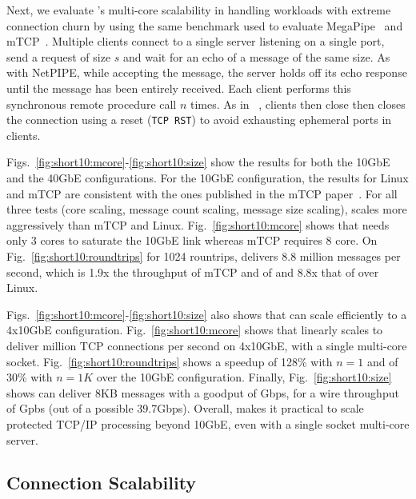 Next, we evaluate \ix's multi-core scalability in handling workloads
with extreme connection churn by using the same benchmark used to
evaluate MegaPipe~\cite{DBLP:conf/osdi/HanMCR12} and
mTCP~\cite{jeong2014mtcp}. Multiple clients connect to a single server
listening on a single port, send a request of size $s$ and wait for an
echo of a message of the same size.  As with NetPIPE, while accepting
the message, the server holds off its echo response until the message
has been entirely received.  Each client performs this synchronous
remote procedure call $n$ times. As in ~\cite{jeong2014mtcp}, clients then close 
then closes the connection using a
reset (\texttt{TCP RST}) to avoid exhausting ephemeral ports in clients.



Figs.~\ref{fig:short10:mcore}-\ref{fig:short10:size} show the results
for both the 10GbE and the 40GbE configurations.  For the 10GbE
configuration, the results for Linux and mTCP are consistent with the
ones published in the mTCP paper~\cite{jeong2014mtcp}.  For all three
tests (core scaling, message count scaling, message size scaling), \ix
scales more aggressively than mTCP and
Linux. Fig.~\ref{fig:short10:mcore} shows that \ix needs only 3 cores
to saturate the 10GbE link whereas mTCP requires 8 core. On
Fig.~\ref{fig:short10:roundtrips} for 1024 rountrips, \ix delivers 8.8
million messages per second, which is 1.9x the throughput of mTCP and
of and  8.8x that of over Linux.

Figs.~\ref{fig:short10:mcore}-\ref{fig:short10:size} also shows that
\ix can scale efficiently to a 4x10GbE configuration.
Fig.~\ref{fig:short10:mcore} shows that \ix linearly scales to deliver
million TCP connections per second on 4x10GbE, with a single multi-core socket.
Fig.~\ref{fig:short10:roundtrips} shows a speedup of 128\% with $n=1$
and of 30\% with $n=1K$ over the 10GbE configuration.  Finally,
Fig.~\ref{fig:short10:size} shows \ix can deliver 8KB messages with a
goodput of Gbps, for a wire throughput of Gpbs (out of
a possible 39.7Gbps).  Overall, \ix makes it practical to scale
protected TCP/IP processing beyond 10GbE, even with a single socket
multi-core server.


\subsection{Connection Scalability}

